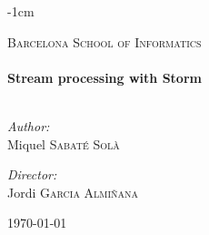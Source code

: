 %
%
%



\begin{titlepage}

\begin{adjustwidth*}{}{-1cm}

\begin{center}

\textsc{\Large Barcelona School of Informatics}\\[0.5cm]

{ \small \HRule \\[0.4cm] }
{ \huge \bf Stream processing with Storm \\[0.4cm] }
{ \small \HRule \\[0.4cm] }

\begin{minipage}{0.4\textwidth}
\begin{flushleft} \large
\emph{Author:}\\
Miquel \textsc{Sabaté Solà}
\end{flushleft}
\end{minipage}
\begin{minipage}{0.4\textwidth}
\begin{flushright} \large
\emph{Director:} \\
Jordi \textsc{Garcia Almiñana}
\end{flushright}
\end{minipage}

\vfill

{\large \today}

\end{center}
\end{adjustwidth*}
\end{titlepage}
